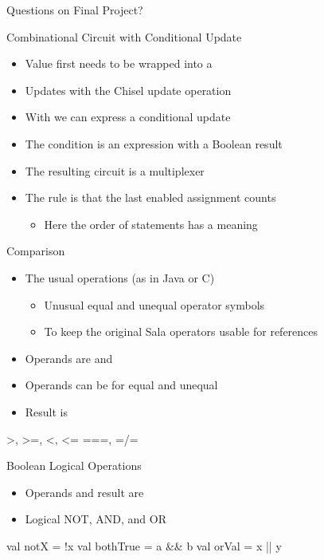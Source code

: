 \begin{frame}[fragile]{Questions on Final Project?}
\end{frame}

\begin{frame}[fragile]{Combinational Circuit with Conditional Update}
\begin{itemize}
\item Value first needs to be wrapped into a 
\item Updates with the Chisel update operation \code{:=}
\item With  we can express a conditional update
\item The condition is an expression with a Boolean result
\item The resulting circuit is a multiplexer
\item The rule is that the last enabled assignment counts
\begin{itemize}
\item Here the order of statements has a meaning
\end{itemize}
\end{itemize}
\end{frame}

\begin{frame}[fragile]{Comparison}
\begin{itemize}
\item The usual operations (as in Java or C)
\begin{itemize}
\item Unusual equal and unequal operator symbols
\item To keep the original Sala operators usable for references
\end{itemize}
\item Operands are  and 
\item Operands can be  for equal and unequal
\item Result is 
\end{itemize}
\begin{chisel}
>, >=, <, <=
===, =/=
\end{chisel}
\end{frame}

\begin{frame}[fragile]{Boolean Logical Operations}
\begin{itemize}
\item Operands and result are 
\item Logical NOT, AND, and OR
\end{itemize}
\begin{chisel}
val notX = !x
val bothTrue = a && b
val orVal = x || y
\end{chisel}
\end{frame}

